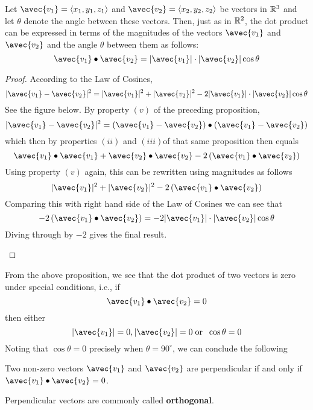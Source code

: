 \documentclass[handout]{ximera}
\begin{document}
\begin{proposition}
Let $\avec{v_1} = \vector{x_1, y_1, z_1}$ and $\avec{v_2} = \vector{x_2, y_2, z_2}$
be vectors in $\mathbb R^3$ and let $\theta$ denote the angle between these vectors.  Then, just as in $\mathbb R^2$, the dot product can be expressed in terms of the 
magnitudes of the vectors $\avec{v_1}$ and $\avec{v_2}$ and the angle $\theta$ between them as follows:
\[
\avec{v_1} \dotp \avec{v_2} = |\avec{v_1}|\cdot |\avec{v_2}| \cos\theta
\]
\begin{proof}
According to the Law of Cosines, 
\[
|\avec{v_1} - \avec{v_2}|^2 = |\avec{v_1}|^2 + |\avec{v_2}|^2 - 2|\avec{v_1}|\cdot| \avec{v_2}|\cos \theta
\]
See the figure below. By property $(v)$ of the preceding proposition, 
\[
|\avec{v_1} - \avec{v_2}|^2 = \left(\avec{v_1} - \avec{v_2}\right)\dotp \left(\avec{v_1} - \avec{v_2}\right)
\]
which then by properties $(ii)$ and $(iii)$of that same proposition then equals
\[
\avec{v_1} \dotp \avec{v_1} + \avec{v_2} \dotp \avec{v_2} - 2\left(\avec{v_1} \dotp \avec{v_2}\right)
\]
Using property $(v)$ again, this can be rewritten using magnitudes as follows
\[
|\avec{v_1}|^2 + |\avec{v_2}|^2 - 2\left(\avec{v_1} \dotp \avec{v_2}\right)
\]
Comparing this with right hand side of the Law of Cosines we can see that
\[
- 2\left(\avec{v_1} \dotp \avec{v_2}\right) = - 2|\avec{v_1}|\cdot| \avec{v_2}|\cos \theta
\]
Diving through by $-2$ gives the final result.

\begin{image}
\end{image}

\end{proof}

\end{proposition}

From the above proposition, we see that the dot product of two vectors is zero under special conditions, i.e.,  if 
\[
\avec{v_1} \dotp \avec{v_2} = 0
\]
then either
\[
|\avec{v_1}| = 0, |\avec{v_2}| = 0 \; \text{or } \; \cos \theta = 0
\]
Noting that $\cos \theta = 0$ precisely when $\theta = 90^\circ$, we can conclude the following
\begin{corollary} 
Two non-zero vectors $\avec{v_1}$ and $\avec{v_2}$ are perpendicular if and only if $\avec{v_1} \dotp \avec{v_2} = 0$.
\end{corollary}
Perpendicular vectors are commonly called {\bf orthogonal}.\\
\end{document}
